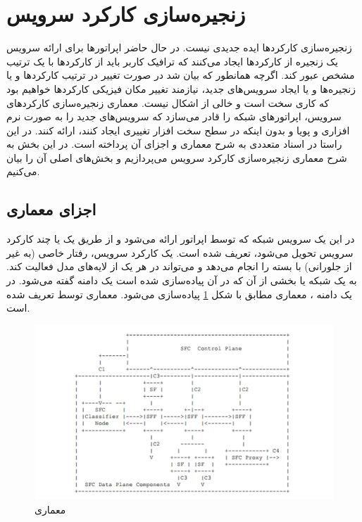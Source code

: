 \section{زنجیره‌سازی کارکرد سرویس}

زنجیره‌سازی کارکردها ایده جدیدی نیست.
در حال حاضر اپراتورها برای ارائه سرویس یک زنجیره از کارکردها ایجاد می‌کنند که ترافیک کاربر باید از کارکردها با یک ترتیب مشخص عبور کند.
اگرچه همانطور که بیان شد در صورت تغییر در ترتیب کارکردها و یا زنجیره‌ها و یا ایجاد سرویس‌های جدید، نیازمند تغییر مکان فیزیکی کارکردها خواهیم بود
که کاری سخت است و خالی از اشکال نیست.
معماری زنجیره‌سازی کارکردهای سرویس، اپراتورهای شبکه را قادر می‌سازد که سرویس‌های جدید را به صورت نرم افزاری و پویا و بدون اینکه در سطح سخت افزار تغییری ایجاد کنند، ارائه کنند.
در این راستا  در اسناد متعددی به شرح معماری و اجزای آن پرداخته است.
در این بخش به شرح معماری زنجیره‌سازی کارکرد سرویس می‌پردازیم و بخش‌های اصلی آن را بیان می‌کنیم.

\subsection{اجزای معماری }

در این  یک سرویس شبکه که توسط اپراتور ارائه می‌شود و
از طریق یک یا چند کارکرد سرویس تحویل می‌شود،
تعریف شده است.
یک کارکرد سرویس، رفتار خاصی (به غیر از جلورانی) با بسته را انجام می‌دهد
و می‌تواند در هر یک از لایه‌های مدل  فعالیت کند.
به یک شبکه یا بخشی از آن که در آن   پیاده‌سازی شده است یک دامنه  گفته می‌شود.
در یک دامنه ، معماری  مطابق با شکل \ref{fig.22} پیاده‌سازی می‌شود.
معماری  توسط  تعریف شده است.

\begin{figure}[h!]
\center\includegraphics[scale=.5]{images/sfc}
\caption{معماری }
\label{fig.22}
\end{figure}

